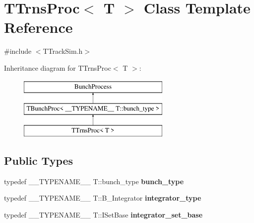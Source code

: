 \hypertarget{classTTrnsProc}{}\section{T\+Trns\+Proc$<$ T $>$ Class Template Reference}
\label{classTTrnsProc}


{\ttfamily \#include $<$T\+Track\+Sim.\+h$>$}

Inheritance diagram for T\+Trns\+Proc$<$ T $>$\+:\begin{figure}[H]
\begin{center}
\leavevmode
\includegraphics[height=3.000000cm]{classTTrnsProc}
\end{center}
\end{figure}
\subsection*{Public Types}
\begin{DoxyCompactItemize}
\item 
\mbox{\label{classTTrnsProc_a04c71e69a15b15e734c5a9ce9a146188}} 
typedef \+\_\+\+\_\+\+T\+Y\+P\+E\+N\+A\+M\+E\+\_\+\+\_\+ T\+::bunch\+\_\+type {\bfseries bunch\+\_\+type}
\item 
\mbox{\label{classTTrnsProc_a4bab78611a7f9201c18b51e5eb0a523e}} 
typedef \+\_\+\+\_\+\+T\+Y\+P\+E\+N\+A\+M\+E\+\_\+\+\_\+ T\+::\+B\+\_\+\+Integrator {\bfseries integrator\+\_\+type}
\item 
\mbox{\label{classTTrnsProc_a89caed69db83a57cd465edf0a7289084}} 
typedef \+\_\+\+\_\+\+T\+Y\+P\+E\+N\+A\+M\+E\+\_\+\+\_\+ T\+::\+I\+Set\+Base {\bfseries integrator\+\_\+set\+\_\+base}
\end{DoxyCompactItemize}
